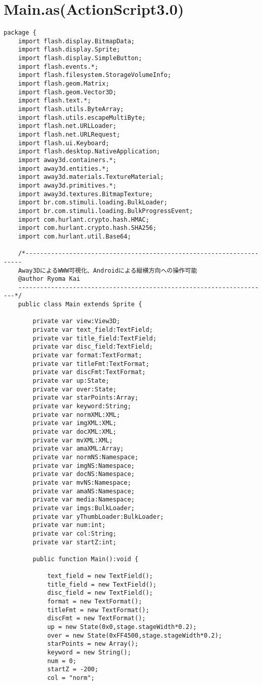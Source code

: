 \section{Main.as(ActionScript3.0)}
{\scriptsize
\begin{verbatim}
package {
	import flash.display.BitmapData;
	import flash.display.Sprite;
	import flash.display.SimpleButton;
	import flash.events.*;
	import flash.filesystem.StorageVolumeInfo;
	import flash.geom.Matrix;
	import flash.geom.Vector3D;
	import flash.text.*;
	import flash.utils.ByteArray;
	import flash.utils.escapeMultiByte;
	import flash.net.URLLoader;
	import flash.net.URLRequest;
	import flash.ui.Keyboard;
	import flash.desktop.NativeApplication;
	import away3d.containers.*;
	import away3d.entities.*;
	import away3d.materials.TextureMaterial;
	import away3d.primitives.*;
	import away3d.textures.BitmapTexture;
	import br.com.stimuli.loading.BulkLoader;
	import br.com.stimuli.loading.BulkProgressEvent;
	import com.hurlant.crypto.hash.HMAC;
	import com.hurlant.crypto.hash.SHA256;
	import com.hurlant.util.Base64;

	/*---------------------------------------------------------------------
	Away3DによるWWW可視化、Androidによる縦横方向への操作可能
	@author Ryoma Kai
	---------------------------------------------------------------------*/
	public class Main extends Sprite {
		
		private var view:View3D;
		private var text_field:TextField;
		private var title_field:TextField;
		private var disc_field:TextField;
		private var format:TextFormat;
		private var titleFmt:TextFormat;
		private var discFmt:TextFormat;
		private var up:State;
		private var over:State;
		private var starPoints:Array;
		private var keyword:String;
		private var normXML:XML;
		private var imgXML:XML;
		private var docXML:XML;
		private var mvXML:XML;
		private var amaXML:Array;
		private var normNS:Namespace;
		private var imgNS:Namespace;
		private var docNS:Namespace;
		private var mvNS:Namespace;
		private var amaNS:Namespace;
		private var media:Namespace;
		private var imgs:BulkLoader;
		private var yThumbLoader:BulkLoader;
		private var num:int;
		private var col:String;
		private var startZ:int;
		
		public function Main():void {
			
			text_field = new TextField();
			title_field = new TextField();
			disc_field = new TextField();
			format = new TextFormat();
			titleFmt = new TextFormat();
			discFmt = new TextFormat();
			up = new State(0x0,stage.stageWidth*0.2);
			over = new State(0xFF4500,stage.stageWidth*0.2);
			starPoints = new Array();
			keyword = new String();
			num = 0;
			startZ = -200;
			col = "norm";
			

\end{verbatim}}
